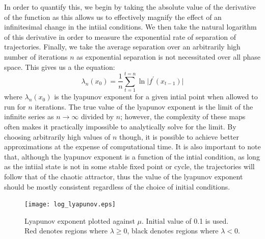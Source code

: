 In order to quantify this, we begin by taking the absolute value of the derivative of the function as this allows us to effectively magnify the effect of an infinitesimal change in the intiial conditions. We then take the natural logarithm of this derivative in order to measure the exponential rate of separation of trajectories. Finally, we take the average separation over an arbitrarily high number of iterations $n$ as exponential separation is not necessitated over all phase space. This gives us a the equation:
\begin{equation}
    \lambda_n(x_0)=\frac{1}{n}\sum^{t=n}_{t=1}\ln\lvert f^\prime(x_{t-1})\rvert
\end{equation}
where $\lambda_n(x_0)$ is the lyapunov exponent for a given intial point when allowed to run for $n$ iterations. The true value of the lyapunov exponent is the limit of the infinite series as $n\rightarrow\infty$ divided by $n$; however, the complexity of these maps often makes it practically impossible to analytically solve for the limit. By choosing arbitrarily high values of $n$ though, it is possible to achieve better approximations at the expense of computational time. It is also important to note that, although the lyapunov exponent is a function of the intial condition, as long as the intiial state is not in some stable fixed point or cycle, the trajectories will follow that of the chaotic attractor, thus the value of the lyapunov exponent should be mostly consistent regardless of the choice of initial conditions.
\begin{figure}
    \centering
    \texttt{[image: log\_lyapunov.eps]}
    \caption{Lyapunov exponent plotted against $\mu$. Initial value of 0.1 is used. Red denotes regions where $\lambda\geq0$, black denotes regions where $\lambda<0$.}
    \label{log_lyapunov}
\end{figure}
